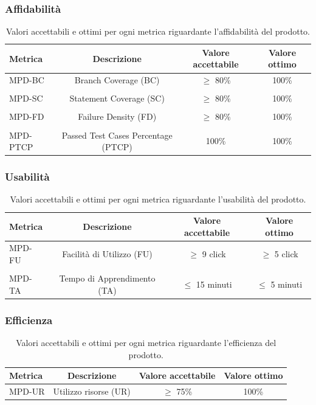 \documentclass[8pt]{article}
\begin{document}
\subsubsection{Affidabilità}
\begin{table}[H]	
	\centering
	\begin{tabular}{lccc}
		\toprule
		\textbf{Metrica}& \textbf{Descrizione} & \textbf{Valore accettabile} & \textbf{Valore ottimo} \\
		\midrule
		MPD-BC & Branch Coverage (BC) & $\geq$ 80\% & 100\%\\\\
		MPD-SC & Statement Coverage (SC) & $\geq$ 80\% & 100\% \\\\
		MPD-FD & Failure Density (FD) & $\geq$ 80\% & 100\% \\\\
		MPD-PTCP & Passed Test Cases Percentage (PTCP) & 100\%  & 100\% \\
		\bottomrule
	\end{tabular}
	\caption{Valori accettabili e ottimi per ogni metrica riguardante l’affidabilità del prodotto.}
	\label{table:Valori accettabili e ottimi per ogni metrica riguardante l’affidabilità del prodotto.}
\end{table}
\subsubsection{Usabilità}
\begin{table}[H]	
	\centering
	\begin{tabular}{lccc}
		\toprule
		\textbf{Metrica}& \textbf{Descrizione} & \textbf{Valore accettabile} & \textbf{Valore ottimo} \\
		\midrule
		MPD-FU & Facilità di Utilizzo (FU) & $\geq$ 9 click & $\geq$ 5 click \\\\
		MPD-TA & Tempo di Apprendimento (TA) & $\leq$ 15 minuti & $\leq$ 5 minuti \\
		\bottomrule
	\end{tabular}
	\caption{Valori accettabili e ottimi per ogni metrica riguardante l’usabilità del prodotto.}
	\label{table:Valori accettabili e ottimi per ogni metrica riguardante l’usabilità del prodotto.}
\end{table}
\subsubsection{Efficienza}
\begin{table}[H]	
	\centering
	\begin{tabular}{lccc}
		\toprule
		\textbf{Metrica}& \textbf{Descrizione} & \textbf{Valore accettabile} & \textbf{Valore ottimo} \\
		\midrule
		MPD-UR & Utilizzo risorse (UR) & $\geq$ 75\% & 100\% \\
		\bottomrule
	\end{tabular}
	\caption{Valori accettabili e ottimi per ogni metrica riguardante l’efficienza del prodotto.}
	\label{table:Valori accettabili e ottimi per ogni metrica riguardante l’efficienza del prodotto.}
\end{table}
\end{document}
